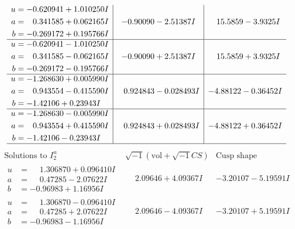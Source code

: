 \documentclass[1p]{elsarticle_modified}
\theoremstyle{definition}
\newcommand{\I}{\sqrt{-1}}
\begin{document}
$$\begin{array}{c|c|c}
\begin{aligned}
u &= -0.620941 + 1.010250 I \\
a &= \phantom{-}0.341585 + 0.062165 I \\
b &= -0.269172 + 0.195766 I\end{aligned}
 & -0.90090 - 2.51387 I & \phantom{-}15.5859 - 3.9325 I \\ \hline\begin{aligned}
u &= -0.620941 - 1.010250 I \\
a &= \phantom{-}0.341585 - 0.062165 I \\
b &= -0.269172 - 0.195766 I\end{aligned}
 & -0.90090 + 2.51387 I & \phantom{-}15.5859 + 3.9325 I \\ \hline\begin{aligned}
u &= -1.268630 + 0.005990 I \\
a &= \phantom{-}0.943554 - 0.415590 I \\
b &= -1.42106 + 0.23943 I\end{aligned}
 & \phantom{-}0.924843 - 0.028493 I & -4.88122 - 0.36452 I \\ \hline\begin{aligned}
u &= -1.268630 - 0.005990 I \\
a &= \phantom{-}0.943554 + 0.415590 I \\
b &= -1.42106 - 0.23943 I\end{aligned}
 & \phantom{-}0.924843 + 0.028493 I & -4.88122 + 0.36452 I\\
 \hline 
 \end{array}$$\newpage$$\begin{array}{c|c|c}  
\text{Solutions to }I^u_{2}& \I (\text{vol} + \sqrt{-1}CS) & \text{Cusp shape}\\
 \hline 
\begin{aligned}
u &= \phantom{-}1.306870 + 0.096410 I \\
a &= \phantom{-}0.47285 - 2.07622 I \\
b &= -0.96983 + 1.16956 I\end{aligned}
 & \phantom{-}2.09646 + 4.09367 I & -3.20107 - 5.19591 I \\ \hline\begin{aligned}
u &= \phantom{-}1.306870 - 0.096410 I \\
a &= \phantom{-}0.47285 + 2.07622 I \\
b &= -0.96983 - 1.16956 I\end{aligned}
 & \phantom{-}2.09646 - 4.09367 I & -3.20107 + 5.19591 I \\ \hline\begin{aligned}

\end{aligned}
\end{array}$$
\end{document}
